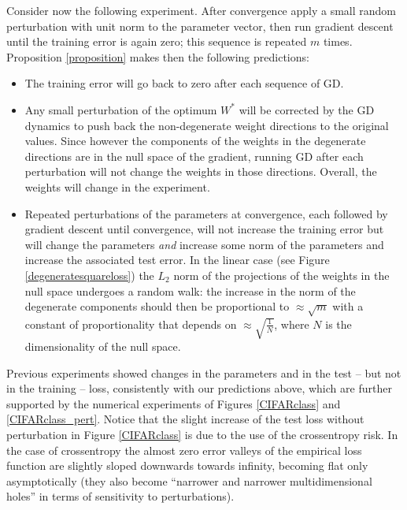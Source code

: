 \documentclass[10pt]{article}
\begin{document}
Consider now the following experiment. After convergence apply a small
random perturbation with unit norm to the parameter vector, then run
gradient descent until the training error is again zero; this sequence
is repeated $m$ times. Proposition \ref{proposition} makes then the
following predictions:

\begin{itemize}
\item The training error will go back to zero after each sequence of
  GD.
\item Any small perturbation of the optimum $W^*$ will be corrected by
  the GD dynamics to push back the non-degenerate weight directions to
  the original values. Since however the components of the weights in
  the degenerate directions are in the null space of the gradient,
  running GD after each perturbation will not change the weights in those
  directions. Overall, the weights will change in the experiment.

\item Repeated perturbations of the parameters at convergence, each
  followed by gradient descent until convergence, will not increase the
  training error but will change the parameters {\it and} increase
  some norm of the parameters and increase the associated test error. In the
  linear case (see Figure \ref{degeneratesquareloss}) the $L_2$ norm
  of the projections of the weights in the null space undergoes a
  random walk: the increase in the norm of the
  degenerate components should then be proportional to
  $\approx \sqrt{m}$ with a constant of proportionality that depends
  on $\approx \sqrt{\frac{1}{N}}$, where $N$ is the dimensionality of
  the null space.

\end{itemize}


Previous  experiments \cite{Theory_II} showed changes in the
parameters and in the test -- but not in the training -- loss,
consistently with our predictions above, which are further supported
by the numerical experiments of Figures \ref{CIFARclass} and
\ref{CIFARclass_pert}. Notice that the slight increase of the test
loss without perturbation in Figure \ref{CIFARclass} is due to the use
of the crossentropy risk. In the case of crossentropy the almost zero
error valleys of the empirical loss function are slightly sloped
downwards towards infinity, becoming flat only asymptotically (they
also become ``narrower and narrower multidimensional holes'' in terms
of sensitivity to perturbations).
\end{document}

